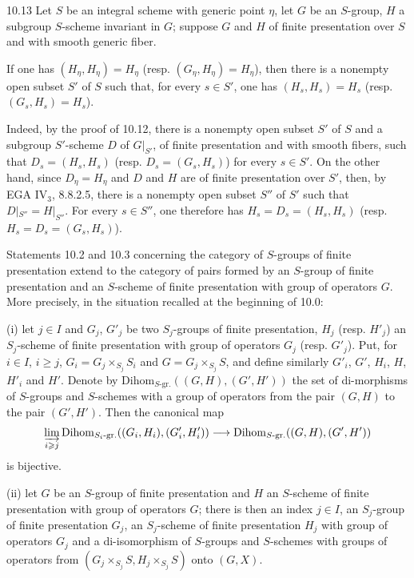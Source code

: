 \begin{corollary}{10.13}\label{VIB.10.13}
Let $S$ be an integral scheme with generic point $\eta$, let $G$ be an $S$-group, $H$ a subgroup $S$-scheme invariant in $G$; suppose $G$ and $H$ of finite presentation over $S$ and with smooth generic fiber.

If one has $(H_\eta,H_\eta)=H_\eta$ (resp. $(G_\eta,H_\eta)=H_\eta$), then there is a nonempty open subset $S'$ of $S$ such that, for every $s\in S'$, one has $(H_s,H_s)=H_s$ (resp. $(G_s,H_s)=H_s$).
\end{corollary}
Indeed, by the proof of 10.12, there is a nonempty open subset $S'$ of $S$ and a subgroup $S'$-scheme $D$ of $G|_{S'}$, of finite presentation and with smooth fibers, such that $D_s=(H_s,H_s)$ (resp. $D_s=(G_s,H_s)$) for every $s\in S'$. On the other hand, since $D_\eta=H_\eta$ and $D$ and $H$ are of finite presentation over $S'$, then, by EGA IV$_3$, 8.8.2.5, there is a nonempty open subset $S''$ of $S'$ such that $D|_{S''}=H|_{S''}$. For every $s\in S''$, one therefore has $H_s=D_s=(H_s,H_s)$ (resp. $H_s=D_s=(G_s,H_s)$).

\label{VIB.10.14}
Statements 10.2 and 10.3 concerning the category of $S$-groups of finite presentation extend to the category of pairs formed by an $S$-group of finite presentation and an $S$-scheme of finite presentation with group of operators $G$. More precisely, in the situation recalled at the beginning of 10.0:

(i) let $j\in I$ and $G_j$, $G'_j$ be two $S_j$-groups of finite presentation, $H_j$ (resp. $H'_j$) an $S_j$-scheme of finite presentation with group of operators $G_j$ (resp. $G'_j$). Put, for $i\in I$, $i\geq j$, $G_i=G_j\times_{S_j}S_i$ and $G=G_j\times_{S_j}S$, and define similarly $G'_i$, $G'$, $H_i$, $H$, $H'_i$ and $H'$. Denote by $\mathrm{Dihom}_{S\text{-gr.}}((G,H),(G',H'))$ the set of di-morphisms of $S$-groups and $S$-schemes with a group of operators from the pair $(G,H)$ to the pair $(G',H')$. Then the canonical map
\[
\varinjlim_{i\geq j}\mathrm{Dihom}_{S_i\text{-gr.}}((G_i,H_i),(G'_i,H'_i))\to\mathrm{Dihom}_{S\text{-gr.}}((G,H),(G',H'))
\]
is bijective.

(ii) let $G$ be an $S$-group of finite presentation and $H$ an $S$-scheme of finite presentation with group of operators $G$; there is then an index $j\in I$, an $S_j$-group of finite presentation $G_j$, an $S_j$-scheme of finite presentation $H_j$ with group of operators $G_j$ and a di-isomorphism of $S$-groups and $S$-schemes with groups of operators from $(G_j\times_{S_j}S,H_j\times_{S_j}S)$ onto $(G,X)$.

